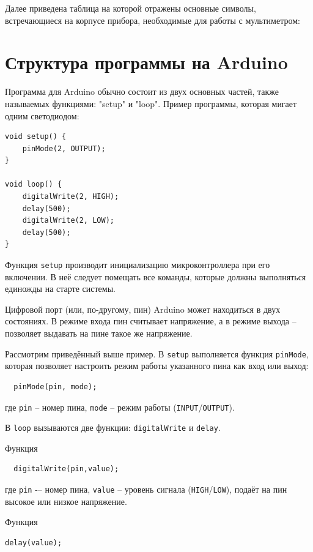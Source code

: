 \documentclass[a4paper,twoside]{book}
\begin{document}
Далее приведена таблица на которой отражены основные символы, встречающиеся на
корпусе прибора, необходимые для работы с мультиметром:

\section{Структура программы на Arduino}

Программа для Arduino обычно состоит из двух основных частей, также называемых
функциями: "setup" и "loop". Пример программы, которая мигает одним светодиодом:
\begin{verbatim}
void setup() {
    pinMode(2, OUTPUT);
}

void loop() {
    digitalWrite(2, HIGH);
    delay(500);
    digitalWrite(2, LOW);
    delay(500);
}
\end{verbatim}

Функция \texttt{setup} производит инициализацию микроконтроллера при его
включении. В неё следует помещать все команды, которые должны выполняться
единожды на старте системы.

Цифровой порт (или, по-другому, пин) Arduino может находиться в двух состояниях.
В режиме входа пин считывает напряжение, а в режиме выхода – позволяет выдавать
на пине такое же напряжение.

Рассмотрим приведённый выше пример. В \texttt{setup} выполняется функция
\texttt{pinMode}, которая позволяет настроить режим работы указанного пина как
вход или выход:

\begin{verbatim}
  pinMode(pin, mode);
\end{verbatim}

где \texttt{pin} -- номер пина, \texttt{mode} -- режим работы
(\texttt{INPUT}/\texttt{OUTPUT}).

В \texttt{loop} вызываются две функции: \texttt{digitalWrite} и \texttt{delay}.

Функция
\begin{verbatim}
  digitalWrite(pin,value);
\end{verbatim}

где \texttt{pin} -– номер пина, \texttt{value} -- уровень сигнала
(\texttt{HIGH}/\texttt{LOW}), подаёт на пин высокое или низкое напряжение.

Функция
\begin{verbatim}
delay(value);
\end{verbatim}
\end{document}
